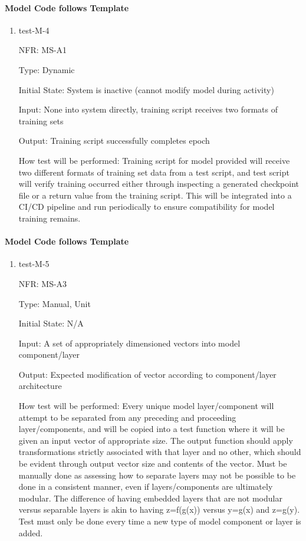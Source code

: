 \documentclass[12pt, titlepage]{article}
\begin{document}
\paragraph{Model Code follows Template }

\begin{enumerate}
  \item{test-M-4}

  NFR: MS-A1

  Type: Dynamic 

  Initial State: System is inactive
  (cannot modify model during activity)

  Input: None into system directly, training script receives two formats of training sets

  Output: Training script successfully completes epoch 

  How test will be performed:
  Training script for model provided will receive two different formats of 
  training set data from a test script, and test script will verify training 
  occurred either through inspecting a generated checkpoint file or a return 
  value from the training script. This will be integrated into a CI/CD pipeline 
  and run periodically to ensure compatibility for model training remains.
\end{enumerate}

\paragraph{Model Code follows Template }
\begin{enumerate}
  \item{test-M-5}

  NFR: MS-A3

  Type: Manual, Unit

  Initial State: N/A

  Input: A set of appropriately dimensioned vectors into model component/layer

  Output: Expected modification of vector according to component/layer architecture

  How test will be performed:
  Every unique model layer/component will attempt to be separated from any preceding and 
  proceeding layer/components, and will be copied into a test function where it 
  will be given an input vector of appropriate size. The output function should 
  apply transformations strictly associated with that layer and no other, which 
  should be evident through output vector size and contents of the vector. Must 
  be manually done as assessing how to separate layers may not be possible to be 
  done in a consistent manner, even if layers/components are ultimately modular. 
  The difference of having embedded layers that are not modular versus separable 
  layers is akin to having z=f(g(x)) versus y=g(x) and z=g(y). Test must only be done 
  every time a new type of model component or layer is added.
\end{enumerate}
\end{document}
